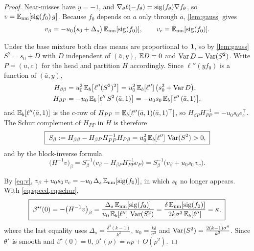 \begin{proof}
 Near-misses have $y=-1$, and $\nabla_\theta\ell(-f_\theta)=\operatorname{sig}(f_\theta)\nabla f_\theta$, so $v=\mathbb{E}_{\mathrm{nm}}[\operatorname{sig}(f_0)\,g]$. Because $f_0$ depends on $a$ only through $\bar a$, \cref{lem:gauss} gives
\begin{equation}\label{eq:v}
  v_\beta=-u_0\big(s_0+\Delta_s\big)\,\mathbb{E}_{\mathrm{nm}}[\operatorname{sig}(f_0)],
  \qquad
  v_c=\mathbb{E}_{\mathrm{nm}}[\operatorname{sig}(f_0)].
\end{equation}

 Under the base mixture both class means are proportional to $\mathbf{1}$, so by \cref{lem:gauss} $S^2=s_0+D$ with $D$ independent of $(\bar a,y)$, $\mathbb{E} D=0$ and $\operatorname{Var} D=\operatorname{Var}(S^2)$. Write $P=(u,c)$ for the head and partition $H$ accordingly. Since $\ell''(yf_0)$ is a function of $(\bar a,y)$,
\begin{align}
  H_{\beta\beta}&=u_0^2\,\mathbb{E}_b\big[\ell''(S^2)^2\big]=u_0^2\,\mathbb{E}_b[\ell'']\,\big(s_0^2+\operatorname{Var} D\big),\label{eq:Hbb}\\
  H_{\beta P}&=-u_0\,\mathbb{E}_b\big[\ell''\,S^2\,(\bar a,1)\big]=-u_0s_0\,\mathbb{E}_b\big[\ell''\,(\bar a,1)\big],\label{eq:HbP}
\end{align}
and $\mathbb{E}_b[\ell''(\bar a,1)]$ is the $c$-row of $H_{PP}=\mathbb{E}_b[\ell''(\bar a,1)(\bar a,1)^\top]$, so $H_{\beta P}H_{PP}^{-1}=-u_0s_0e_c^\top$. The Schur complement of $H_{PP}$ in $H$ is therefore
\begin{equation}\label{eq:schur}
  \boxed{\;S_\beta:=H_{\beta\beta}-H_{\beta P}H_{PP}^{-1}H_{P\beta}=u_0^2\,\mathbb{E}_b[\ell'']\,\operatorname{Var}(S^2)>0,\;}
\end{equation}
and by the block-inverse formula
\begin{equation}\label{eq:blockinv}
  \big(H^{-1}v\big)_\beta=S_\beta^{-1}\big(v_\beta-H_{\beta P}H_{PP}^{-1}v_P\big)=S_\beta^{-1}\big(v_\beta+u_0s_0\,v_c\big).
\end{equation}

 By \cref{eq:v}, $v_\beta+u_0s_0\,v_c=-u_0\,\Delta_s\,\mathbb{E}_{\mathrm{nm}}[\operatorname{sig}(f_0)]$, in which $s_0$ no longer appears. With \cref{eq:speed,eq:schur},
\begin{equation}\label{eq:kappa}
  \boxed{\;\beta^{\star\prime}(0)=-\big(H^{-1}v\big)_\beta
  =\frac{\Delta_s\,\mathbb{E}_{\mathrm{nm}}[\operatorname{sig}(f_0)]}{u_0\,\mathbb{E}_b[\ell'']\,\operatorname{Var}(S^2)}
  =\frac{\delta\,\mathbb{E}_{\mathrm{nm}}[\operatorname{sig}(f_0)]}{2k\sigma^2\,\mathbb{E}_b[\ell'']}=\kappa,\;}
\end{equation}
where the last equality uses $\Delta_s=\frac{\delta^2(k-1)}{k^2}$, $u_0=\frac{k\delta}{\sigma^2}$ and $\operatorname{Var}(S^2)=\frac{2(k-1)\sigma^4}{k^2}$. Since $\theta^\star$ is smooth and $\beta^\star(0)=0$, $\beta^\star(\rho)=\kappa\rho+O(\rho^2)$.


\end{proof}
